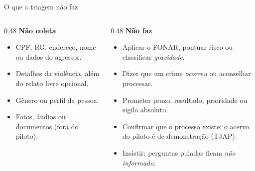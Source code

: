 \documentclass[aspectratio=169,10pt]{beamer}
\begin{document}
\begin{frame}{O que a triagem não faz}
\begin{columns}[T]
\begin{column}{0.48\textwidth}
\textbf{Não coleta}
\begin{itemize}\small\setlength\itemsep{3pt}
  \item CPF, RG, endereço, nome ou dados do agressor.
  \item Detalhes da violência, além do relato livre opcional.
  \item Gênero ou perfil da pessoa.
  \item Fotos, áudios ou documentos (fora do piloto).
\end{itemize}
\end{column}
\begin{column}{0.48\textwidth}
\textbf{Não faz}
\begin{itemize}\small\setlength\itemsep{3pt}
  \item Aplicar o FONAR, pontuar risco ou classificar \emph{gravidade}.
  \item Dizer que um crime \emph{ocorreu} ou aconselhar processar.
  \item Prometer prazo, resultado, prioridade ou sigilo absoluto.
  \item Confirmar que o processo existe: o acervo do piloto é de demonstração (TJAP).
  \item Insistir: perguntas puladas ficam \emph{não informado}.
\end{itemize}
\end{column}
\end{columns}
\vskip6pt
\end{frame}
\end{document}
